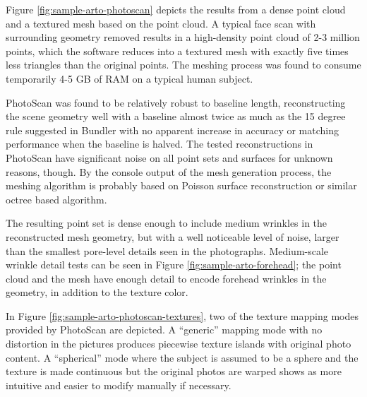 Figure \ref{fig:sample-arto-photoscan} depicts the results from a dense point cloud and a textured mesh based on the point cloud.
A typical face scan with surrounding geometry removed results in a high-density point cloud of 2-3 million points, which the software reduces into a textured mesh with exactly five times less triangles than the original points.
The meshing process was found to consume temporarily 4-5 GB of RAM on a typical human subject.

PhotoScan was found to be relatively robust to baseline length, reconstructing the scene geometry well with a baseline almost twice as much as the 15 degree rule suggested in Bundler with no apparent increase in accuracy or matching performance when the baseline is halved.
The tested reconstructions in PhotoScan have significant noise on all point sets and surfaces for unknown reasons, though.
By the console output of the mesh generation process, the meshing algorithm is probably based on Poisson surface reconstruction or similar octree based algorithm.

The resulting point set is dense enough to include medium wrinkles in the reconstructed mesh geometry, but with a well noticeable level of noise, larger than the smallest pore-level details seen in the photographs.
Medium-scale wrinkle detail tests can be seen in Figure \ref{fig:sample-arto-forehead}; the point cloud and the mesh have enough detail to encode forehead wrinkles in the geometry, in addition to the texture color.

In Figure \ref{fig:sample-arto-photoscan-textures}, two of the texture mapping modes provided by PhotoScan are depicted.
A ``generic'' mapping mode with no distortion in the pictures produces piecewise texture islands with original photo content.
A ``spherical'' mode where the subject is assumed to be a sphere and the texture is made continuous but the original photos are warped shows as more intuitive and easier to modify manually if necessary.




